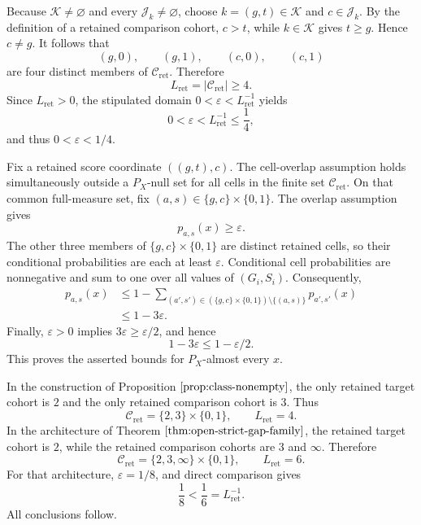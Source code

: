 Because \(\mathcal K\ne\varnothing\) and every \(\mathcal J_k\ne\varnothing\), choose \(k=(g,t)\in\mathcal K\) and \(c\in\mathcal J_k\). By the definition of a retained comparison cohort, \(c>t\), while \(k\in\mathcal K\) gives \(t\ge g\). Hence \(c\ne g\). It follows that
\[
(g,0),\qquad (g,1),\qquad (c,0),\qquad (c,1)
\]
are four distinct members of \(\mathcal C_{\mathrm{ret}}\). Therefore
\[
L_{\mathrm{ret}}=|\mathcal C_{\mathrm{ret}}|\ge4.
\]
Since \(L_{\mathrm{ret}}>0\), the stipulated domain \(0<\varepsilon<L_{\mathrm{ret}}^{-1}\) yields
\[
0<\varepsilon<L_{\mathrm{ret}}^{-1}\le\frac14,
\]
and thus \(0<\varepsilon<1/4\).

Fix a retained score coordinate \(((g,t),c)\). The cell-overlap assumption holds simultaneously outside a \(P_X\)-null set for all cells in the finite set \(\mathcal C_{\mathrm{ret}}\). On that common full-measure set, fix \((a,s)\in\{g,c\}\times\{0,1\}\). The overlap assumption gives
\[
p_{a,s}(x)\ge\varepsilon.
\]
The other three members of \(\{g,c\}\times\{0,1\}\) are distinct retained cells, so their conditional probabilities are each at least \(\varepsilon\). Conditional cell probabilities are nonnegative and sum to one over all values of \((G_i,S_i)\). Consequently,
\[
\begin{aligned}
p_{a,s}(x)
&\le 1-
\sum_{(a',s')\in(\{g,c\}\times\{0,1\})\setminus\{(a,s)\}}
p_{a',s'}(x)\\
&\le1-3\varepsilon.
\end{aligned}
\]
Finally, \(\varepsilon>0\) implies \(3\varepsilon\ge\varepsilon/2\), and hence
\[
1-3\varepsilon\le1-\varepsilon/2.
\]
This proves the asserted bounds for \(P_X\)-almost every \(x\).

In the construction of Proposition \(\ref{prop:class-nonempty}\), the only retained target cohort is \(2\) and the only retained comparison cohort is \(3\). Thus
\[
\mathcal C_{\mathrm{ret}}=\{2,3\}\times\{0,1\},
\qquad L_{\mathrm{ret}}=4.
\]
In the architecture of Theorem \(\ref{thm:open-strict-gap-family}\), the retained target cohort is \(2\), while the retained comparison cohorts are \(3\) and \(\infty\). Therefore
\[
\mathcal C_{\mathrm{ret}}=\{2,3,\infty\}\times\{0,1\},
\qquad L_{\mathrm{ret}}=6.
\]
For that architecture, \(\varepsilon=1/8\), and direct comparison gives
\[
\frac18<\frac16=L_{\mathrm{ret}}^{-1}.
\]
All conclusions follow.